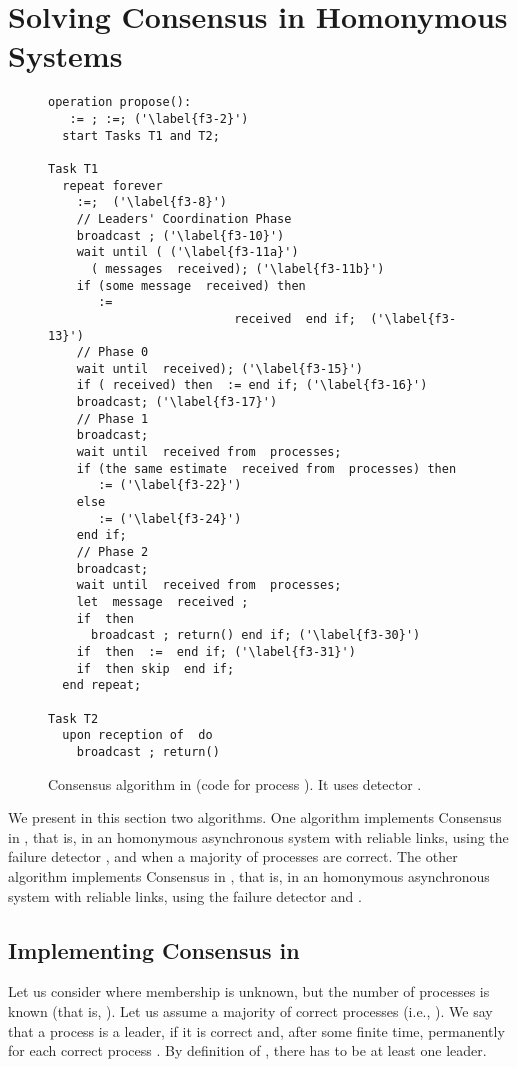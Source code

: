 \documentclass[10pt, conference, compsocconf]{IEEEtran}
\begin{document}
\section{Solving  Consensus in Homonymous Systems}
\label{sec:FDs-based-consensus}




\begin{figure}
\begin{lstlisting}
operation propose(): 
   := ; :=; ('\label{f3-2}')
  start Tasks T1 and T2;
  
Task T1
  repeat forever
    :=;  ('\label{f3-8}')
    // Leaders' Coordination Phase
    broadcast ; ('\label{f3-10}')
    wait until ( ('\label{f3-11a}')
      ( messages  received); ('\label{f3-11b}')
    if (some message  received) then 
       :=
                          received  end if;  ('\label{f3-13}')
    // Phase 0
    wait until  received); ('\label{f3-15}')
    if ( received) then  := end if; ('\label{f3-16}')
    broadcast; ('\label{f3-17}')
    // Phase 1
    broadcast;
    wait until  received from  processes;
    if (the same estimate  received from  processes) then 
       := ('\label{f3-22}')
    else
       := ('\label{f3-24}')
    end if;
    // Phase 2
    broadcast;
    wait until  received from  processes;
    let  message  received ;
    if  then 
      broadcast ; return() end if; ('\label{f3-30}')
    if  then  :=  end if; ('\label{f3-31}')
    if  then skip  end if;
  end repeat;

Task T2
  upon reception of  do
    broadcast ; return()
\end{lstlisting}
\caption{Consensus algorithm in 
(code for process ).
It uses detector .
}
\label{Fig-Cons-HOmega}
\end{figure}



We present in this section two algorithms. One algorithm implements 
Consensus in , that is,
in an homonymous asynchronous system with reliable links, using the failure
detector ,  
and when a majority of processes are correct. 
The other algorithm implements Consensus in , that is,
in an homonymous asynchronous system with reliable links, using the failure
detector  and .  


\subsection{Implementing Consensus in }
Let us  consider  where  membership is unknown,
but the number of processes is known (that is, ). 
Let us assume a majority of correct processes (i.e., ).
We say  that a process   is a leader, if  it is correct  and, after some
finite  time,    permanently  for each  correct  process
. By definition of , there has to be at least one leader. 
\end{document}
